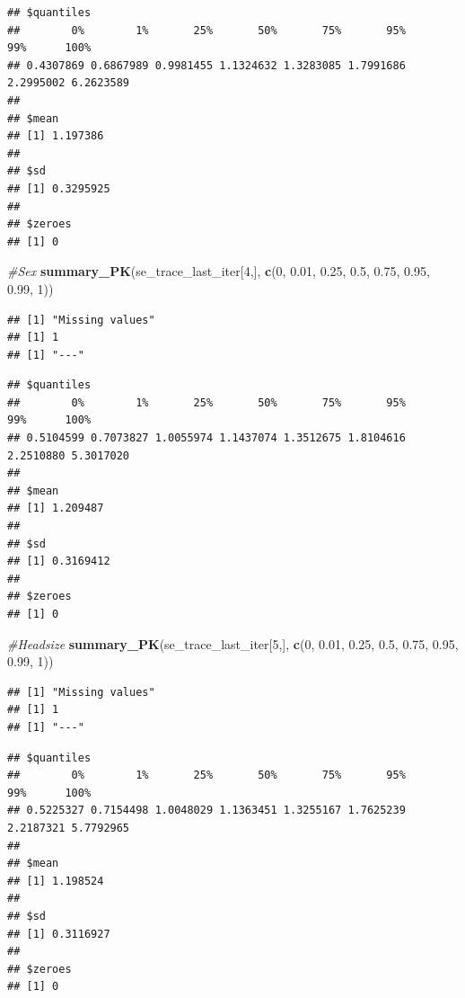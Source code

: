 \documentclass[]{article}
\newenvironment{Shaded}{\begin{snugshade}}{\end{snugshade}}
\newcommand{\CommentTok}[1]{\textcolor[rgb]{0.56,0.35,0.01}{\textit{#1}}}
\newcommand{\DecValTok}[1]{\textcolor[rgb]{0.00,0.00,0.81}{#1}}
\newcommand{\FloatTok}[1]{\textcolor[rgb]{0.00,0.00,0.81}{#1}}
\newcommand{\KeywordTok}[1]{\textcolor[rgb]{0.13,0.29,0.53}{\textbf{#1}}}
\newcommand{\NormalTok}[1]{#1}
\begin{document}
\begin{verbatim}
## $quantiles
##        0%        1%       25%       50%       75%       95%       99%      100% 
## 0.4307869 0.6867989 0.9981455 1.1324632 1.3283085 1.7991686 2.2995002 6.2623589 
## 
## $mean
## [1] 1.197386
## 
## $sd
## [1] 0.3295925
## 
## $zeroes
## [1] 0
\end{verbatim}

\begin{Shaded}
\begin{Highlighting}[]
\CommentTok{#Sex}
\KeywordTok{summary_PK}\NormalTok{(se_trace_last_iter[}\DecValTok{4}\NormalTok{,], }\KeywordTok{c}\NormalTok{(}\DecValTok{0}\NormalTok{, }\FloatTok{0.01}\NormalTok{, }\FloatTok{0.25}\NormalTok{, }\FloatTok{0.5}\NormalTok{, }\FloatTok{0.75}\NormalTok{, }\FloatTok{0.95}\NormalTok{, }\FloatTok{0.99}\NormalTok{, }\DecValTok{1}\NormalTok{))}
\end{Highlighting}
\end{Shaded}

\begin{verbatim}
## [1] "Missing values"
## [1] 1
## [1] "---"
\end{verbatim}

\begin{verbatim}
## $quantiles
##        0%        1%       25%       50%       75%       95%       99%      100% 
## 0.5104599 0.7073827 1.0055974 1.1437074 1.3512675 1.8104616 2.2510880 5.3017020 
## 
## $mean
## [1] 1.209487
## 
## $sd
## [1] 0.3169412
## 
## $zeroes
## [1] 0
\end{verbatim}

\begin{Shaded}
\begin{Highlighting}[]
\CommentTok{#Headsize}
\KeywordTok{summary_PK}\NormalTok{(se_trace_last_iter[}\DecValTok{5}\NormalTok{,], }\KeywordTok{c}\NormalTok{(}\DecValTok{0}\NormalTok{, }\FloatTok{0.01}\NormalTok{, }\FloatTok{0.25}\NormalTok{, }\FloatTok{0.5}\NormalTok{, }\FloatTok{0.75}\NormalTok{, }\FloatTok{0.95}\NormalTok{, }\FloatTok{0.99}\NormalTok{, }\DecValTok{1}\NormalTok{))}
\end{Highlighting}
\end{Shaded}

\begin{verbatim}
## [1] "Missing values"
## [1] 1
## [1] "---"
\end{verbatim}

\begin{verbatim}
## $quantiles
##        0%        1%       25%       50%       75%       95%       99%      100% 
## 0.5225327 0.7154498 1.0048029 1.1363451 1.3255167 1.7625239 2.2187321 5.7792965 
## 
## $mean
## [1] 1.198524
## 
## $sd
## [1] 0.3116927
## 
## $zeroes
## [1] 0
\end{verbatim}
\end{document}
